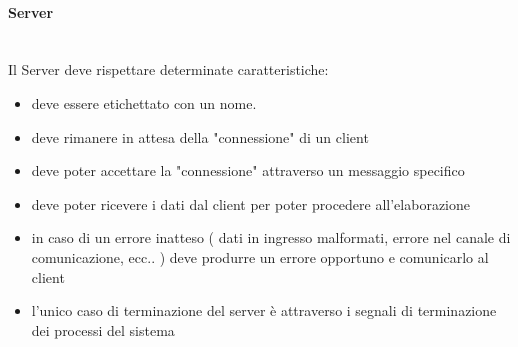 \documentclass[12pt]{article}
\begin{document}
\paragraph{Server} \mbox{}\\
Il Server deve rispettare determinate caratteristiche:
\begin{itemize}
    \item deve essere etichettato con un nome.
    \item deve rimanere in attesa della "connessione" di un client
    \item deve poter accettare la "connessione" attraverso un messaggio specifico
    \item deve poter ricevere i dati dal client per poter procedere all'elaborazione
    \item in caso di un errore inatteso ( dati in ingresso malformati, errore nel canale di comunicazione, ecc.. ) deve produrre un errore opportuno e comunicarlo al client 
    \item l'unico caso di terminazione del server è attraverso i segnali di terminazione dei processi del sistema
\end{itemize}
\end{document}
